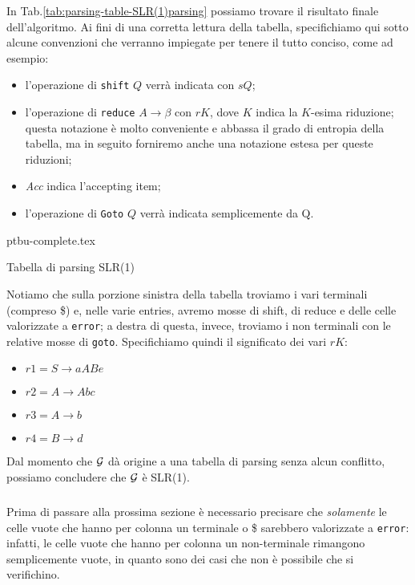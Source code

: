 \documentclass[class=book, crop=false, oneside, 12pt]{standalone}
\begin{document}
In Tab.\ref{tab:parsing-table-SLR(1)parsing} possiamo trovare il risultato finale dell'algoritmo. Ai fini di una corretta lettura della tabella, specifichiamo qui sotto alcune convenzioni che verranno impiegate per tenere il tutto conciso, come ad esempio:
\begin{itemize}
    \item l'operazione di \texttt{shift} \(Q\) verrà indicata con \(sQ\);
    \item l'operazione di \texttt{reduce} \(A \rightarrow \beta\) con \(rK\), dove \(K\) indica la \(K\)-esima riduzione; questa notazione è molto conveniente e abbassa il grado di entropia della tabella, ma in seguito forniremo anche una notazione estesa per queste riduzioni;
    \item \emph{Acc} indica l'accepting item;
    \item l'operazione di \texttt{Goto} \(Q\) verrà indicata semplicemente da Q.
\end{itemize}
\begin{table}[H]
    \centering
    {ptbu-complete.tex}
    \caption{Tabella di parsing SLR(1)}
    \label{tab:parsing-table-SLR(1)parsing}
\end{table}
Notiamo che sulla porzione sinistra della tabella troviamo i vari terminali (compreso \$) e, nelle varie entries, avremo mosse di shift, di reduce e delle celle valorizzate a \texttt{error}; a destra di questa, invece, troviamo i non terminali con le relative mosse di \texttt{goto}.
Specifichiamo quindi il significato dei vari \(rK\):
\begin{itemize}
    \item \(r1 = S \to aABe\)
    \item \(r2 = A \to Abc\)
    \item \(r3 = A \to b\)
    \item \(r4 = B \to d\)
\end{itemize}
Dal momento che \(\mathcal{G}\) dà origine a una tabella di parsing senza alcun conflitto, possiamo concludere che \(\mathcal{G}\) è SLR(1).

\subparagraph*{}
Prima di passare alla prossima sezione è necessario precisare che \emph{solamente} le celle vuote che hanno per colonna un terminale o \$ sarebbero valorizzate a \texttt{error}: infatti, le celle vuote che hanno per colonna un non-terminale rimangono semplicemente vuote, in quanto sono dei casi che non è possibile che si verifichino. 
\end{document}

